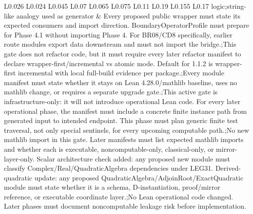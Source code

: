\begin{longtable}{L{0.026\linewidth} L{0.024\linewidth} L{0.045\linewidth} L{0.07\linewidth} L{0.065\linewidth} L{0.075\linewidth} L{0.11\linewidth} L{0.19\linewidth} L{0.155\linewidth} L{0.17\linewidth}}
logic;\newline string-like analogy used as generator & Every proposed public wrapper must state its expected consumers and import direction. BoundaryOperatorProfile must prepare for Phase 4.1 without importing Phase 4. For BR08/\allowbreak{}CD8 specifically, earlier route modules export data downstream and must not import the bridge.;\newline This gate does not refactor code, but it must require every later refactor manifest to declare wrapper-first/\allowbreak{}incremental vs atomic mode. Default for 1.1.2 is wrapper-first incremental with local full-build evidence per package.;\newline Every module manifest must state whether it stays on Lean 4.28.0/\allowbreak{}mathlib baseline, uses no mathlib change, or requires a separate upgrade gate.;\newline This active gate is infrastructure-only: it will not introduce operational Lean code. For every later operational phase, the manifest must include a concrete finite instance path from generated input to intended endpoint. This phase must plan generic finite test traversal, not only special sentinels, for every upcoming computable path.;\newline No new mathlib import in this gate. Later manifests must list expected mathlib imports and whether each is executable, noncomputable-only, classical-only, or mirror-layer-only. Scalar architecture check added: any proposed new module must classify Complex/\allowbreak{}Real/\allowbreak{}QuadraticAlgebra dependencies under LEG31. Derived-quadratic update: any proposed QuadraticAlgebra/\allowbreak{}AdjoinRoot/\allowbreak{}ExactQuadratic module must state whether it is a schema, D-instantiation, proof/\allowbreak{}mirror reference, or executable coordinate layer.;\newline No Lean operational code changed. Later phases must document noncomputable leakage risk before implementation.\\
\hline
\addlinespace[0.24em]

\end{longtable}
